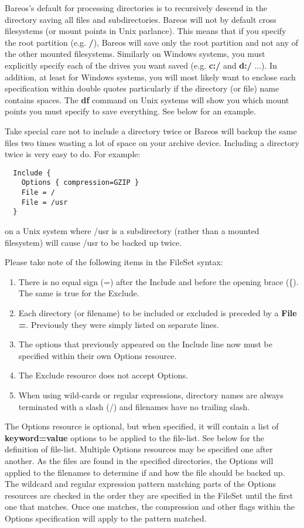 Bareos's default for processing directories is to recursively descend in
the directory saving all files and subdirectories.  Bareos will not by
default cross filesystems (or mount points in Unix parlance).  This means
that if you specify the root partition (e.g.  {\bf /}), Bareos will save
only the root partition and not any of the other mounted filesystems.
Similarly on Windows systems, you must explicitly specify each of the
drives you want saved (e.g.
{\bf c:/} and {\bf d:/} ...). In addition, at least for Windows systems, you
will most likely want to enclose each specification within double quotes
particularly if the directory (or file) name contains spaces. The {\bf df}
command on Unix systems will show you which mount points you must specify to
save everything. See below for an example.

Take special care not to include a directory twice or Bareos will backup
the same files two times wasting a lot of space on your archive device.
Including a directory twice is very easy to do.  For example:

\footnotesize
\begin{verbatim}
  Include {
    Options { compression=GZIP }
    File = /
    File = /usr
  }
\end{verbatim}
\normalsize

on a Unix system where /usr is a subdirectory (rather than a mounted
filesystem) will cause /usr to be backed up twice.

Please take note of the following items in the FileSet syntax:

\begin{enumerate}
\item There is no equal sign (=) after the Include and before the opening
   brace (\{). The same is true for the Exclude.
\item Each directory (or filename) to be included or excluded is preceded by a {\bf File
   =}.  Previously they were simply listed on separate lines.
\item The options that previously appeared on the Include line now must be
   specified within their own Options resource.
\item The Exclude resource does not accept Options.
\item When using wild-cards or regular expressions, directory names are
   always terminated with a slash (/) and filenames have no trailing slash.
\end{enumerate}

The Options resource is optional, but when specified, it will contain a
list of {\bf keyword=value} options to be applied to the file-list.
See below for the definition of file-list.
Multiple Options resources may be specified one after another.  As the
files are found in the specified directories, the Options will applied to
the filenames to determine if and how the file should be backed up.  The
wildcard and regular expression pattern matching parts of the
Options resources are checked in the order they are specified in the
FileSet until the first one that matches. Once one matches, the
compression and other flags within the Options specification will
apply to the pattern matched.

